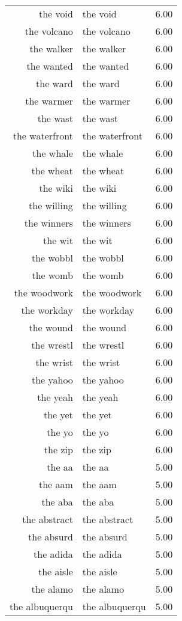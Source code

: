 \begin{table}[ht]
\begin{tabular}{rlr}
  the void & the void & 6.00 \\ 
  the volcano & the volcano & 6.00 \\ 
  the walker & the walker & 6.00 \\ 
  the wanted & the wanted & 6.00 \\ 
  the ward & the ward & 6.00 \\ 
  the warmer & the warmer & 6.00 \\ 
  the wast & the wast & 6.00 \\ 
  the waterfront & the waterfront & 6.00 \\ 
  the whale & the whale & 6.00 \\ 
  the wheat & the wheat & 6.00 \\ 
  the wiki & the wiki & 6.00 \\ 
  the willing & the willing & 6.00 \\ 
  the winners & the winners & 6.00 \\ 
  the wit & the wit & 6.00 \\ 
  the wobbl & the wobbl & 6.00 \\ 
  the womb & the womb & 6.00 \\ 
  the woodwork & the woodwork & 6.00 \\ 
  the workday & the workday & 6.00 \\ 
  the wound & the wound & 6.00 \\ 
  the wrestl & the wrestl & 6.00 \\ 
  the wrist & the wrist & 6.00 \\ 
  the yahoo & the yahoo & 6.00 \\ 
  the yeah & the yeah & 6.00 \\ 
  the yet & the yet & 6.00 \\ 
  the yo & the yo & 6.00 \\ 
  the zip & the zip & 6.00 \\ 
  the aa & the aa & 5.00 \\ 
  the aam & the aam & 5.00 \\ 
  the aba & the aba & 5.00 \\ 
  the abstract & the abstract & 5.00 \\ 
  the absurd & the absurd & 5.00 \\ 
  the adida & the adida & 5.00 \\ 
  the aisle & the aisle & 5.00 \\ 
  the alamo & the alamo & 5.00 \\ 
  the albuquerqu & the albuquerqu & 5.00 \\ 

\end{tabular}
\end{table}
